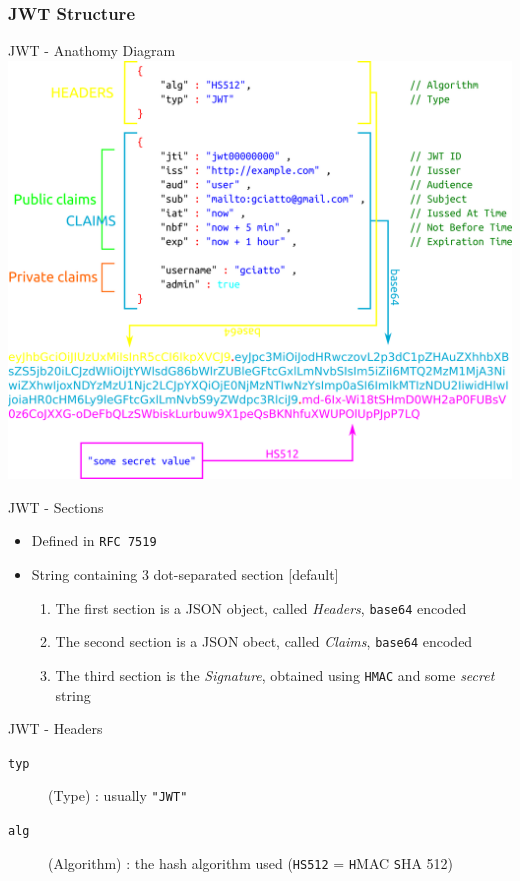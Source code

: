 \begin{frame}[allowframebreaks]
	\frametitle{JWT Structure}
	
	\begin{block}{JWT - Anathomy Diagram}
		\centering
		\includegraphics[height=0.7\textheight]{img/jwt.png}
	\end{block}
	
	\framebreak
	
	\begin{block}{JWT - Sections}
		\begin{itemize}
			\item Defined in \texttt{RFC 7519}
			\item String containing 3 dot-separated section
				[default]
				\begin{enumerate}
					\item The first section is a JSON object, called \emph{Headers}, \texttt{base64} encoded
					\item The second section is a JSON obect, called \emph{Claims}, \texttt{base64} encoded
					\item The third section is the \emph{Signature}, obtained using \texttt{HMAC} and some \emph{secret} string
				\end{enumerate}
		\end{itemize}
	\end{block}
	
	\begin{block}{JWT - Headers}
		\begin{description}
			\item[\texttt{typ}] (Type) : usually \texttt{"JWT"} 
			\item[\texttt{alg}] (Algorithm) : the hash algorithm used (\texttt{HS512} = \texttt{H}MAC \texttt{S}HA 512)
		\end{description}
	\end{block}
	

\end{frame}
